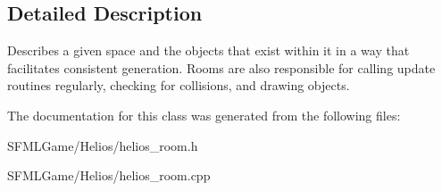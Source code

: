 \subsection{Detailed Description}
Describes a given space and the objects that exist within it in a way that facilitates consistent generation. Rooms are also responsible for calling update routines regularly, checking for collisions, and drawing objects. 

The documentation for this class was generated from the following files\+:\begin{DoxyCompactItemize}
\item 
S\+F\+M\+L\+Game/\+Helios/helios\+\_\+room.\+h\item 
S\+F\+M\+L\+Game/\+Helios/helios\+\_\+room.\+cpp\end{DoxyCompactItemize}
